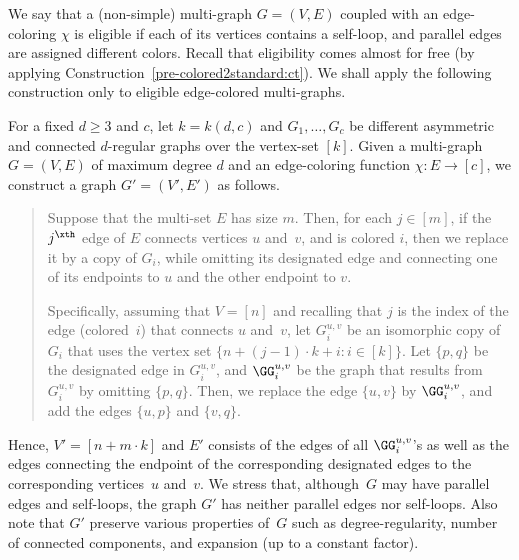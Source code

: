 We say that a (non-simple) multi-graph $G=(V,E)$
coupled with an edge-coloring $\chi$ is {\sf eligible}
if each of its vertices contains a self-loop,
and parallel edges are assigned different colors.
Recall that eligibility comes almost for free
(by applying Construction~\ref{pre-colored2standard:ct}).
We shall apply the following construction
only to eligible edge-colored multi-graphs.

\label{colored2standard:ct}
For a fixed $d\geq3$ and $c$, let $k=k(d,c)$
and $G_1,\ldots,G_c$ be different asymmetric
and connected $d$-regular graphs over the vertex-set $[k]$.
%
Given a multi-graph $G=(V,E)$ of maximum degree $d$
and an edge-coloring function $\chi\!:\!E\!\to\![c]$,
we construct a graph $G'=(V',E')$ as follows.
\begin{quote}
%
Suppose that the multi-set $E$ has size $m$.
Then, for each $j\in[m]$, if the $j^\xth$ edge of $E$
connects vertices $u$ and~$v$, and is colored $i$,
then we replace it by a copy of $G_i$, 
%
while omitting its designated edge and connecting
one of its endpoints to $u$ and the other endpoint to $v$.

Specifically, assuming that $V=[n]$ and
recalling that $j$ is the index of the edge
{\rm(colored~$i$)} that connects $u$ and~$v$,
let $G_i^{u,v}$ be an isomorphic copy of $G_i$
that uses the vertex set $\{n+(j-1)\cdot k+i:i\!\in\![k]\}$.
Let $\{p,q\}$ be the designated edge in $G_i^{u,v}$,
and $\GG_i^{u,v}$ be the graph that results from $G_i^{u,v}$
by omitting $\{p,q\}$.
Then, we replace the edge $\{u,v\}$ by $\GG_i^{u,v}$,
and add the edges $\{u,p\}$ and $\{v,q\}$.
%
\end{quote}
Hence, $V'=[n+m\cdot k]$
and $E'$ consists of the edges of all $\GG_i^{u,v}$'s
as well as the edges connecting the endpoint of the corresponding
designated edges to the corresponding vertices~$u$ and~$v$.
\ECT
We stress that, although~$G$ may have parallel edges and self-loops,
the graph $G'$ has neither parallel edges nor self-loops.
Also note that $G'$ preserve various properties of~$G$
such as degree-regularity, number of connected components,
and expansion (up to a constant factor).

%
%
%
%
%
%
%
%
%
%
%

